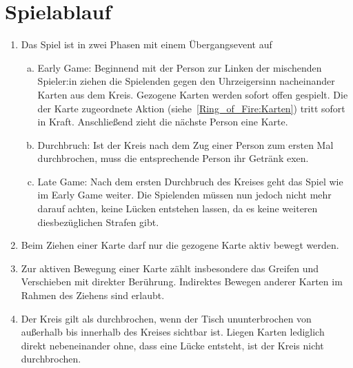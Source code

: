 \section{Spielablauf}
\begin{enumerate}[label={(\arabic*)}]
	\item
	Das Spiel ist in zwei Phasen mit einem Übergangsevent auf
	\begin{enumerate}[a.]
		\item
		Early Game:
		Beginnend mit der Person zur Linken der mischenden Spieler:in ziehen die Spielenden gegen den Uhrzeigersinn nacheinander Karten aus dem Kreis.
		Gezogene Karten werden sofort offen gespielt.
		Die der Karte zugeordnete Aktion (siehe~\ref{Ring_of_Fire:Karten}) tritt sofort in Kraft.
		Anschließend zieht die nächste Person eine Karte.
		\item
		Durchbruch:
		Ist der Kreis nach dem Zug einer Person zum ersten Mal durchbrochen, muss die entsprechende Person ihr Getränk exen.
		\item
		Late Game:
		Nach dem ersten Durchbruch des Kreises geht das Spiel wie im Early Game weiter.
		Die Spielenden müssen nun jedoch nicht mehr darauf achten, keine Lücken entstehen lassen, da es keine weiteren diesbezüglichen Strafen gibt.
	\end{enumerate}

	\item
	Beim Ziehen einer Karte darf nur die gezogene Karte aktiv bewegt werden.

	\item
	Zur aktiven Bewegung einer Karte zählt insbesondere das Greifen und Verschieben mit direkter Berührung. Indirektes Bewegen anderer Karten im Rahmen des Ziehens sind erlaubt.

	\item
	Der Kreis gilt als durchbrochen, wenn der Tisch ununterbrochen von außerhalb bis innerhalb des Kreises sichtbar ist. Liegen Karten lediglich direkt nebeneinander ohne, dass eine Lücke entsteht, ist der Kreis nicht durchbrochen.
\end{enumerate}

